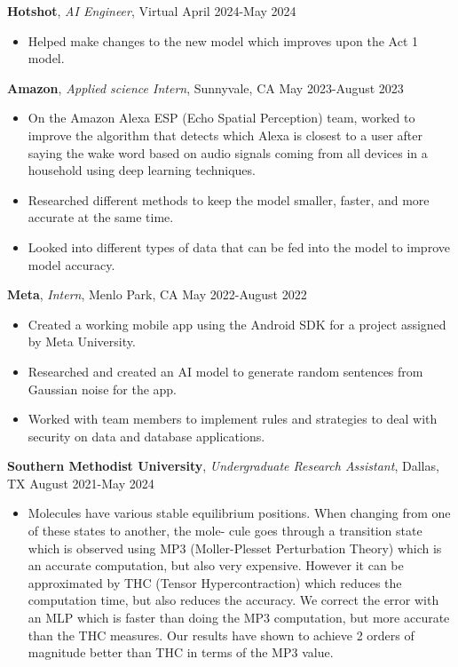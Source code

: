 \documentclass[a4paper,10pt]{article}
\begin{document}
\noindent\textbf{Hotshot}, \textit{AI Engineer}, Virtual \hfill April 2024-May 2024
\begin{itemize}[noitemsep,topsep=0pt]
  \item Helped make changes to the new model which improves upon the Act 1 model.
\end{itemize}

\noindent\textbf{Amazon}, \textit{Applied science Intern}, Sunnyvale, CA \hfill May 2023-August 2023
\begin{itemize}[noitemsep,topsep=0pt]
  \item On the Amazon Alexa ESP (Echo Spatial Perception) team, worked to improve the algorithm that detects which Alexa is closest to a user after saying the wake word based on audio signals coming from all devices in a household using deep learning techniques.
  \item Researched different methods to keep the model smaller, faster, and more accurate at the same time.
  \item Looked into different types of data that can be fed into the model to improve model accuracy.
\end{itemize}

\noindent\textbf{Meta}, \textit{Intern}, Menlo Park, CA \hfill May 2022-August 2022
\begin{itemize}[noitemsep,topsep=0pt]
  \item Created a working mobile app using the Android SDK for a project assigned by Meta University.
  \item Researched and created an AI model to generate random sentences from Gaussian noise for the app.
  \item Worked with team members to implement rules and strategies to deal with security on data and database applications.
\end{itemize}

\noindent\textbf{Southern Methodist University}, \textit{Undergraduate Research Assistant}, Dallas, TX \hfill August 2021-May 2024
\begin{itemize}[noitemsep,topsep=0pt]
  \item Molecules have various stable equilibrium positions. When changing from one of these states to another, the mole- cule goes through a transition state which is observed using MP3 (Moller-Plesset Perturbation Theory) which is an accurate computation, but also very expensive. However it can be approximated by THC (Tensor Hypercontraction) which reduces the computation time, but also reduces the accuracy. We correct the error with an MLP which is faster than doing the MP3 computation, but more accurate than the THC measures. Our results have shown to achieve 2 orders of magnitude better than THC in terms of the MP3 value.
\end{itemize}
\end{document}
